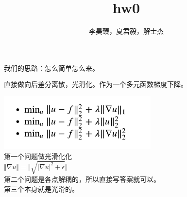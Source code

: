 \documentclass{beamer}
\title[Mantle Convection]{hw0}
\author{李昊臻，夏君毅，解士杰 }
\begin{document}
\begin{frame}
我们的思路：怎么简单怎么来。\par
直接做向后差分离散，光滑化。作为一个多元函数梯度下降。\par
\includegraphics[width=8cm]{0.png}\\
第一个问题做光滑化化\\$\Vert \nabla u\Vert  = \Vert \sqrt{\vert\nabla u\vert^2 + \epsilon}\Vert $\\
第二个问题是各点解耦的，所以直接写答案就可以。\\
第三个本身就是光滑的。
\end{frame}


\end{document}
